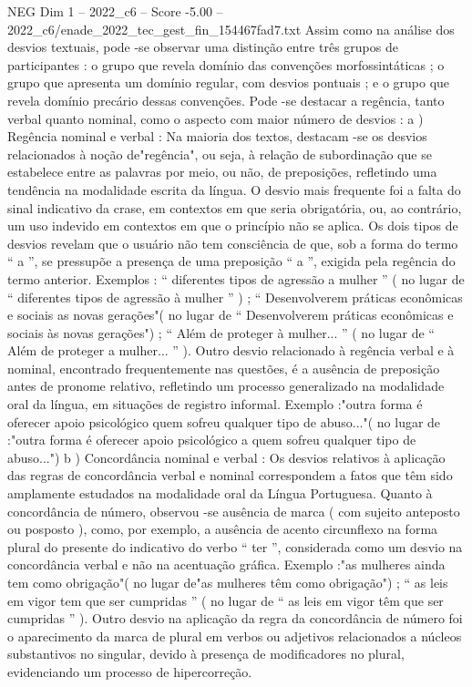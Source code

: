 \begin{textsample}{NEG Dim 1 – 2022\_c6 – Score -5.00 – 2022\_c6/enade\_2022\_tec\_gest\_fin\_154467fad7.txt}
Assim como na análise dos desvios textuais, pode -se observar uma distinção entre três grupos de participantes : o grupo que revela domínio das convenções morfossintáticas ; o grupo que apresenta um domínio regular, com desvios pontuais ; e o grupo que revela domínio precário dessas convenções.
Pode -se destacar a regência, tanto verbal quanto nominal, como o aspecto com maior número de desvios : a ) Regência nominal e verbal : Na maioria dos textos, destacam -se os desvios relacionados à noção de"regência", ou seja, à relação de subordinação que se estabelece entre as palavras por meio, ou não, de preposições, refletindo uma tendência na modalidade escrita da língua.
O desvio mais frequente foi a falta do sinal indicativo da crase, em contextos em que seria obrigatória, ou, ao contrário, um uso indevido em contextos em que o princípio não se aplica.
Os dois tipos de desvios revelam que o usuário não tem consciência de que, sob a forma do termo “ a ”, se pressupõe a presença de uma preposição “ a ”, exigida pela regência do termo anterior.
Exemplos : “ diferentes tipos de agressão a mulher ” ( no lugar de “ diferentes tipos de agressão à mulher ” ) ; “ Desenvolverem práticas econômicas e sociais as novas gerações"( no lugar de “ Desenvolverem práticas econômicas e sociais às novas gerações") ; “ Além de proteger à mulher... ” ( no lugar de “ Além de proteger a mulher... ” ).
Outro desvio relacionado à regência verbal e à nominal, encontrado frequentemente nas questões, é a ausência de preposição antes de pronome relativo, refletindo um processo generalizado na modalidade oral da língua, em situações de registro informal.
Exemplo :"outra forma é oferecer apoio psicológico quem sofreu qualquer tipo de abuso..."( no lugar de :"outra forma é oferecer apoio psicológico a quem sofreu qualquer tipo de abuso...") b ) Concordância nominal e verbal : Os desvios relativos à aplicação das regras de concordância verbal e nominal correspondem a fatos que têm sido amplamente estudados na modalidade oral da Língua Portuguesa.
Quanto à concordância de número, observou -se ausência de marca ( com sujeito anteposto ou posposto ), como, por exemplo, a ausência de acento circunflexo na forma plural do presente do indicativo do verbo “ ter ”, considerada como um desvio na concordância verbal e não na acentuação gráfica.
Exemplo :"as mulheres ainda tem como obrigação"( no lugar de"as mulheres têm como obrigação") ; “ as leis em vigor tem que ser cumpridas ” ( no lugar de “ as leis em vigor têm que ser cumpridas ” ).
Outro desvio na aplicação da regra da concordância de número foi o aparecimento da marca de plural em verbos ou adjetivos relacionados a núcleos substantivos no singular, devido à presença de modificadores no plural, evidenciando um processo de hipercorreção.

\end{textsample}
